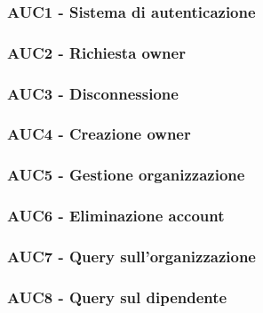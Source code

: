 \documentclass[../analisi-dei-requisiti.tex]{subfiles}
\begin{document}
\subsubsection{AUC1 - Sistema di autenticazione}%
\label{subs:AUC1}



\subsubsection{AUC2 - Richiesta owner}%
\label{subs:AUC2}



\subsubsection{AUC3 - Disconnessione}%
\label{subs:AUC3}



\subsubsection{AUC4 - Creazione owner}%
\label{subs:AUC4}



\subsubsection{AUC5 - Gestione organizzazione}%
\label{subs:AUC5}



\subsubsection{AUC6 - Eliminazione account}%
\label{subs:AUC6}



\subsubsection{AUC7 - Query sull'organizzazione}%
\label{subs:AUC7}



\subsubsection{AUC8 - Query sul dipendente}%
\label{subs:AUC8}
\end{document}
